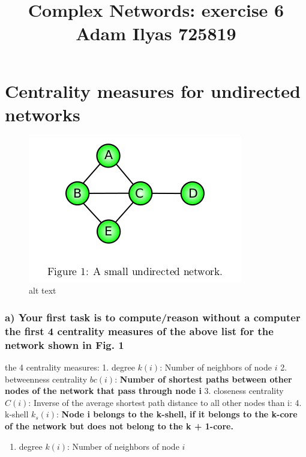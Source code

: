 \documentclass[11pt]{article}
\title{Complex Networds: exercise 6 \\ Adam Ilyas 725819}
\makeatletter
\def\maxwidth{\ifdim\Gin@nat@width>\linewidth\linewidth
    \else\Gin@nat@width\fi}
\let\Oldincludegraphics\includegraphics
\renewcommand{\includegraphics}[1]{\Oldincludegraphics[width=.8\maxwidth]{#1}}
\providecommand{\tightlist}{%
      \setlength{\itemsep}{0pt}\setlength{\parskip}{0pt}}
\makeatother
\begin{document}
    
    
    \maketitle
    
   
    \section{Centrality measures for undirected
networks}\label{centrality-measures-for-undirected-networks}

    \begin{figure}
\centering
\includegraphics{../assets/fig.png}
\caption{alt text}
\end{figure}

    \subsubsection{a) Your first task is to compute/reason without a
computer the first 4 centrality measures of the above list for the
network shown in Fig.
1}\label{a-your-first-task-is-to-computereason-without-a-computer-the-first-4-centrality-measures-of-the-above-list-for-the-network-shown-in-fig.-1}

the 4 centrality measures: 1. degree \(k(i)\): Number of neighbors of
node \(i\) 2. betweenness centrality \(bc(i)\): \textbf{Number of
shortest paths between other nodes of the network that pass through node
i} 3. closeness centrality \(C(i)\): Inverse of the average shortest
path distance to all other nodes than i: 4. k-shell \(k_s(i)\):
\textbf{Node i belongs to the k-shell, if it belongs to the k-core of
the network but does not belong to the k + 1-core.}

    \begin{enumerate}
\def\labelenumi{\arabic{enumi}.}
\tightlist
\item
  degree \(k(i)\): Number of neighbors of node \(i\) 
\end{enumerate}
\end{document}
